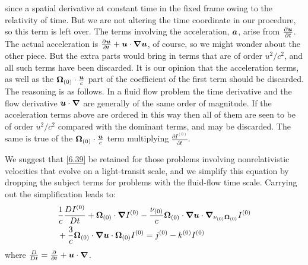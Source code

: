 since a spatial derivative at constant time in the fixed frame owing to the
relativity of time. But we are not altering the time coordinate in our
procedure, so this term is left over. The terms involving the acceleration,
$\boldsymbol{a}$, arise from $\frac{\partial \boldsymbol{u}}{\partial t}$. The actual
acceleration is $\frac{\partial \boldsymbol{u}}{\partial t} + \boldsymbol{u}\cdot\boldsymbol{\nabla}\boldsymbol{u}$,
of course, so we might wonder about the other piece. But the extra parts would
bring in terms that are of order $u^2/c^2$, and all such terms have been
discarded. It is our opinion that the acceleration terms, as well as the
$\boldsymbol{\Omega}_{(0)}\cdot \frac{\boldsymbol{u}}{c}$ part of the coefficient of the first term
should be discarded. The reasoning is as follows. In a fluid flow problem the
time derivative and the flow derivative $\boldsymbol{u}\cdot\boldsymbol{\nabla}$ are generally of the
same order of magnitude. If the acceleration terms above are ordered in this
way then all of them are seen to be of order $u^2/c^2$ compared with the
dominant terms, and may be discarded. The same is true of the
$\boldsymbol{\Omega}_{(0)}\cdot\frac{\boldsymbol{u}}{c}$ term multiplying $\frac{\partial
I^{(0)}}{\partial t}$.

We suggest that \cref{6.39} be retained for those problems involving
nonrelativistic velocities that evolve on a light-transit scale, and we
simplify this equation by dropping the subject terms for problems
with the fluid-flow time scale. Carrying out the simplification leads to:
\begin{equation}
  \begin{split}
    &\frac{1}{c}\frac{D I^{(0)}}{Dt} +\boldsymbol{\Omega}_{(0)}\cdot\boldsymbol{\nabla}
    I^{(0)}-\frac{\nu_{(0)}}{c}\boldsymbol{\Omega}_{(0)}\cdot\boldsymbol{\nabla}\boldsymbol{u}\cdot
    \boldsymbol{\nabla}_{\nu_{(0)}\boldsymbol{\Omega}_{(0)}}I^{(0)}\\
    &+\frac{3}{c}\boldsymbol{\Omega}_{(0)}\cdot\boldsymbol{\nabla}\boldsymbol{u}\cdot\boldsymbol{\Omega}_{(0)}I^{(0)} =
    j^{(0)}-k^{(0)}I^{(0)}
  \end{split}
\end{equation}
where $\frac{D}{Dt}=\frac{\partial}{\partial t}+\boldsymbol{u}\cdot\boldsymbol{\nabla}$.

